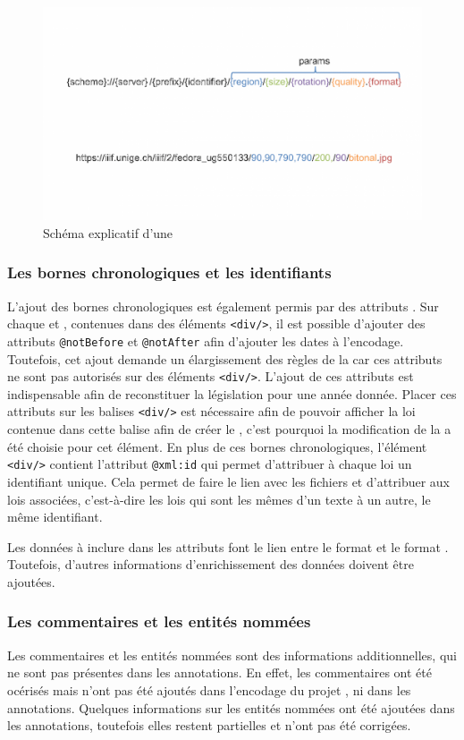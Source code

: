 \begin{figure}
    \centering
    \includegraphics[width=\textwidth]{images/iiif.png}
    \caption{Schéma explicatif d'une \URL \IIIF}
\end{figure}
 
\subsubsection{Les bornes chronologiques et les identifiants \XML}
L'ajout des bornes chronologiques est également permis par des attributs \TEI. Sur chaque \lu et \li, contenues dans des éléments \texttt{<div/>}, il est possible d'ajouter des attributs \texttt{@notBefore} et \texttt{@notAfter} afin d'ajouter les dates à l'encodage. Toutefois, cet ajout demande un élargissement des règles de la \TEI car ces attributs ne sont pas autorisés sur des éléments \texttt{<div/>}. L'ajout de ces attributs est indispensable afin de reconstituer la législation pour une année donnée. Placer ces attributs sur les balises \texttt{<div/>} est nécessaire afin de pouvoir afficher la loi contenue dans cette balise afin de créer le \cv, c'est pourquoi la modification de la \TEI a été choisie pour cet élément. En plus de ces bornes chronologiques, l'élément \texttt{<div/>} contient l'attribut \texttt{@xml:id} qui permet d'attribuer à chaque loi un identifiant unique. Cela permet de faire le lien avec les fichiers \JSON et d'attribuer aux lois associées, c'est-à-dire les lois qui sont les mêmes d'un texte à un autre, le même identifiant. 

Les données à inclure dans les attributs font le lien entre le format \XML et le format \JSON. Toutefois, d'autres informations d'enrichissement des données doivent être ajoutées. 

\subsubsection{Les commentaires et les entités nommées}
Les commentaires et les entités nommées sont des informations additionnelles, qui ne sont pas présentes dans les annotations. En effet, les commentaires ont été océrisés mais n'ont pas été ajoutés dans l'encodage \XML du projet \LSC, ni dans les annotations. Quelques informations sur les entités nommées ont été ajoutées dans les annotations, toutefois elles restent partielles et n'ont pas été corrigées. 

